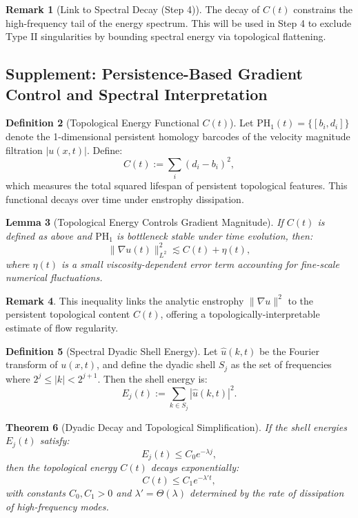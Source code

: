 \documentclass[11pt]{article}
\newtheorem{theorem}{Theorem}[section]
\newtheorem{lemma}[theorem]{Lemma}
\theoremstyle{definition}
\newtheorem{definition}[theorem]{Definition}
\newtheorem{remark}[theorem]{Remark}
\begin{document}
\begin{remark}[Link to Spectral Decay (Step 4)]
The decay of $C(t)$ constrains the high-frequency tail of the energy spectrum. This will be used in Step 4 to exclude Type II singularities by bounding spectral energy via topological flattening.
\end{remark}


\subsection*{Supplement: Persistence-Based Gradient Control and Spectral Interpretation}

\begin{definition}[Topological Energy Functional $C(t)$]
Let $\mathrm{PH}_1(t) = \{ [b_i, d_i] \}$ denote the 1-dimensional persistent homology barcodes of the velocity magnitude filtration $|u(x,t)|$. Define:
\[
C(t) := \sum_i (d_i - b_i)^2,
\]
which measures the total squared lifespan of persistent topological features. This functional decays over time under enstrophy dissipation.
\end{definition}

\begin{lemma}[Topological Energy Controls Gradient Magnitude]
If $C(t)$ is defined as above and $\mathrm{PH}_1$ is bottleneck stable under time evolution, then:
\[
\|\nabla u(t)\|_{L^2}^2 \lesssim C(t) + \eta(t),
\]
where $\eta(t)$ is a small viscosity-dependent error term accounting for fine-scale numerical fluctuations.
\end{lemma}

\begin{remark}
This inequality links the analytic enstrophy $\|\nabla u\|^2$ to the persistent topological content $C(t)$, offering a topologically-interpretable estimate of flow regularity.
\end{remark}

\begin{definition}[Spectral Dyadic Shell Energy]
Let $\hat{u}(k,t)$ be the Fourier transform of $u(x,t)$, and define the dyadic shell $S_j$ as the set of frequencies where $2^j \leq |k| < 2^{j+1}$. Then the shell energy is:
\[
E_j(t) := \sum_{k \in S_j} |\hat{u}(k,t)|^2.
\]
\end{definition}

\begin{theorem}[Dyadic Decay and Topological Simplification]
If the shell energies $E_j(t)$ satisfy:
\[
E_j(t) \leq C_0 e^{-\lambda j},
\]
then the topological energy $C(t)$ decays exponentially:
\[
C(t) \leq C_1 e^{-\lambda' t},
\]
with constants $C_0, C_1 > 0$ and $\lambda' = \Theta(\lambda)$ determined by the rate of dissipation of high-frequency modes.
\end{theorem}
\end{document}
